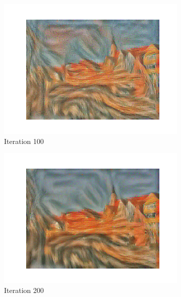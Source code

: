 \documentclass[12pt]{article}
\begin{document}
\begin{figure}[htbp]
\begin{subfigure}[t]{0.48\textwidth}
        \centering
        \includegraphics[trim={3in 0in 3in 0in},scale=0.5]{./Homework2/output/hw2p2_fig07.png}
        \caption{Iteration 100}
    \label{hw2p2h}
    \end{subfigure}
    \begin{subfigure}[t]{0.48\textwidth}
        \centering
        \includegraphics[trim={3in 0in 3in 0in},scale=0.5]{./Homework2/output/hw2p2_fig08.png}
        \caption{Iteration 200}
    \label{hw2p2i}
    \end{subfigure}
    \begin{subfigure}[t]{0.48\textwidth}
        \centering

\end{subfigure}
\end{figure}
\end{document}
